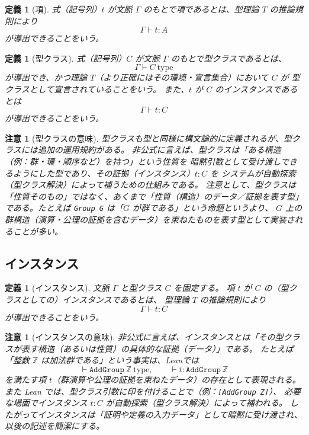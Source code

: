 \documentclass[a4paper,12pt]{bxjsbook}
\newlength{\customindent}
\newenvironment{body}{
  \par
  \begingroup
  \setlength{\leftskip}{\customindent}
  \setlength{\rightskip}{0pt}
  \setlength{\parindent}{1em}
  \setlength{\displayindent}{\customindent}
  \setlength{\displaywidth}{\dimexpr\linewidth-\customindent\relax}
}{
  \par
  \endgroup
}
\theoremstyle{theorem}
\newtheorem{definition}[theorem]{定義}
\newtheorem{remark}[theorem]{注意}
\begin{document}
\begin{body}
    \begin{definition}[項]
        式（記号列）$t$ が文脈 $\Gamma$ のもとで項であるとは、型理論 $T$ の推論規則により
        \[
        \Gamma \vdash t : A
        \]
        が導出できることをいう。
    \end{definition}

    \begin{definition}[型クラス]
        式（記号列）$C$ が文脈 $\Gamma$ のもとで型クラスであるとは、
        \[
        \Gamma \vdash C\ \text{type}
        \]
        が導出でき、かつ理論 $T$（より正確にはその環境・宣言集合）において $C$ が \emph{型クラスとして宣言されている}ことをいう。
        また、$t$ が $C$ の\emph{インスタンス}であるとは
        \[
        \Gamma \vdash t : C
        \]
        が導出できることをいう。
    \end{definition}

    \begin{remark}[型クラスの意味]
        型クラスも型と同様に構文論的に定義されるが、型クラスには追加の運用規約がある。
        非公式に言えば、型クラスは「ある構造（例：群・環・順序など）を持つ」という性質を \emph{暗黙引数として受け渡し}できるようにした型であり、その証拠（インスタンス）$t:C$ を システムが自動探索（型クラス解決）によって補うための仕組みである。
        注意として、型クラスは「性質そのもの」ではなく、あくまで「性質（構造）のデータ／証拠を表す型」 である。たとえば \texttt{Group G} は「$G$ が群である」という命題というより、 $G$ 上の群構造（演算・公理の証拠を含むデータ）を束ねたものを表す型として実装されることが多い。
    \end{remark}

    \subsection{インスタンス}
    \begin{definition}[インスタンス]
        文脈 $\Gamma$ と型クラス $C$ を固定する。
        項 $t$ が $C$ の（型クラスとしての）\emph{インスタンス}であるとは、
        型理論 $T$ の推論規則により
        \[
        \Gamma \vdash t : C
        \]
        が導出できることをいう。
    \end{definition}

    \begin{remark}[インスタンスの意味]
        非公式に言えば、インスタンスとは「その型クラスが表す構造（あるいは性質）の具体的な証拠（データ）」である。
        たとえば「整数 $\mathbb{Z}$ は加法群である」という事実は、Leanでは
        \[
        \vdash \texttt{AddGroup}\ \mathbb{Z}\ \text{type},\qquad \vdash t : \texttt{AddGroup}\ \mathbb{Z}
        \]
        を満たす項 $t$（群演算や公理の証拠を束ねたデータ）の存在として表現される。
        また Lean では、型クラス引数に印を付けることで（例：\texttt{[AddGroup Z]}）、 必要な場面でインスタンス $t:C$ が自動探索（型クラス解決）によって補われる。
        したがってインスタンスは「証明や定義の入力データ」として暗黙に受け渡され、以後の記述を簡潔にする。
    \end{remark}


\end{body}
\end{document}

